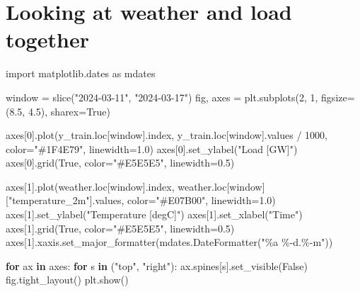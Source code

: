 \documentclass[
  english,
  letterpaper,
]{scrbook}
\newenvironment{Shaded}{\begin{snugshade}}{\end{snugshade}}
\newcommand{\BuiltInTok}[1]{\textcolor[rgb]{0.00,0.23,0.31}{#1}}
\newcommand{\ControlFlowTok}[1]{\textcolor[rgb]{0.00,0.23,0.31}{\textbf{#1}}}
\newcommand{\DecValTok}[1]{\textcolor[rgb]{0.68,0.00,0.00}{#1}}
\newcommand{\FloatTok}[1]{\textcolor[rgb]{0.68,0.00,0.00}{#1}}
\newcommand{\ImportTok}[1]{\textcolor[rgb]{0.00,0.46,0.62}{#1}}
\newcommand{\KeywordTok}[1]{\textcolor[rgb]{0.00,0.23,0.31}{\textbf{#1}}}
\newcommand{\NormalTok}[1]{\textcolor[rgb]{0.00,0.23,0.31}{#1}}
\newcommand{\OperatorTok}[1]{\textcolor[rgb]{0.37,0.37,0.37}{#1}}
\newcommand{\SpecialCharTok}[1]{\textcolor[rgb]{0.37,0.37,0.37}{#1}}
\newcommand{\StringTok}[1]{\textcolor[rgb]{0.13,0.47,0.30}{#1}}
\newcommand{\VariableTok}[1]{\textcolor[rgb]{0.07,0.07,0.07}{#1}}
\begin{document}
\section{Looking at weather and load
together}\label{looking-at-weather-and-load-together}

\begin{Shaded}
\begin{Highlighting}[]
\ImportTok{import}\NormalTok{ matplotlib.dates }\ImportTok{as}\NormalTok{ mdates}

\NormalTok{window }\OperatorTok{=} \BuiltInTok{slice}\NormalTok{(}\StringTok{"2024{-}03{-}11"}\NormalTok{, }\StringTok{"2024{-}03{-}17"}\NormalTok{)}
\NormalTok{fig, axes }\OperatorTok{=}\NormalTok{ plt.subplots(}\DecValTok{2}\NormalTok{, }\DecValTok{1}\NormalTok{, figsize}\OperatorTok{=}\NormalTok{(}\FloatTok{8.5}\NormalTok{, }\FloatTok{4.5}\NormalTok{), sharex}\OperatorTok{=}\VariableTok{True}\NormalTok{)}

\NormalTok{axes[}\DecValTok{0}\NormalTok{].plot(y\_train.loc[window].index, y\_train.loc[window].values }\OperatorTok{/} \DecValTok{1000}\NormalTok{,}
\NormalTok{             color}\OperatorTok{=}\StringTok{"\#1F4E79"}\NormalTok{, linewidth}\OperatorTok{=}\FloatTok{1.0}\NormalTok{)}
\NormalTok{axes[}\DecValTok{0}\NormalTok{].set\_ylabel(}\StringTok{"Load [GW]"}\NormalTok{)}
\NormalTok{axes[}\DecValTok{0}\NormalTok{].grid(}\VariableTok{True}\NormalTok{, color}\OperatorTok{=}\StringTok{"\#E5E5E5"}\NormalTok{, linewidth}\OperatorTok{=}\FloatTok{0.5}\NormalTok{)}

\NormalTok{axes[}\DecValTok{1}\NormalTok{].plot(weather.loc[window].index, weather.loc[window][}\StringTok{"temperature\_2m"}\NormalTok{].values,}
\NormalTok{             color}\OperatorTok{=}\StringTok{"\#E07B00"}\NormalTok{, linewidth}\OperatorTok{=}\FloatTok{1.0}\NormalTok{)}
\NormalTok{axes[}\DecValTok{1}\NormalTok{].set\_ylabel(}\StringTok{"Temperature [degC]"}\NormalTok{)}
\NormalTok{axes[}\DecValTok{1}\NormalTok{].set\_xlabel(}\StringTok{"Time"}\NormalTok{)}
\NormalTok{axes[}\DecValTok{1}\NormalTok{].grid(}\VariableTok{True}\NormalTok{, color}\OperatorTok{=}\StringTok{"\#E5E5E5"}\NormalTok{, linewidth}\OperatorTok{=}\FloatTok{0.5}\NormalTok{)}
\NormalTok{axes[}\DecValTok{1}\NormalTok{].xaxis.set\_major\_formatter(mdates.DateFormatter(}\StringTok{"\%a }\SpecialCharTok{\%{-}d}\StringTok{.\%{-}m"}\NormalTok{))}

\ControlFlowTok{for}\NormalTok{ ax }\KeywordTok{in}\NormalTok{ axes:}
    \ControlFlowTok{for}\NormalTok{ s }\KeywordTok{in}\NormalTok{ (}\StringTok{"top"}\NormalTok{, }\StringTok{"right"}\NormalTok{):}
\NormalTok{        ax.spines[s].set\_visible(}\VariableTok{False}\NormalTok{)}
\NormalTok{fig.tight\_layout()}
\NormalTok{plt.show()}
\end{Highlighting}
\end{Shaded}
\end{document}
